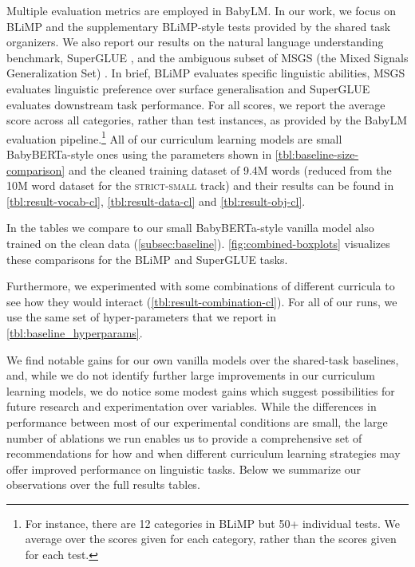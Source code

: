 Multiple evaluation metrics are employed in BabyLM. In our work, we focus on BLiMP \cite{warstadt2020blimp} and the supplementary BLiMP-style tests provided by the shared task organizers. We also report our results on the natural language understanding benchmark, SuperGLUE \cite{wang2019superglue}, and the ambiguous subset of MSGS (the Mixed Signals Generalization Set) \cite{warstadt2020msgs}. In brief, BLiMP evaluates specific linguistic abilities, MSGS evaluates linguistic preference over surface generalisation and SuperGLUE evaluates downstream task performance. For all scores, we report the average score across all categories, rather than test instances, as provided by the BabyLM evaluation pipeline.\footnote{For instance, there are 12 categories in BLiMP but 50+ individual tests. We average over the scores given for each category, rather than the scores given for each test.} All of our curriculum learning models are small BabyBERTa-style ones using the parameters shown in \cref{tbl:baseline-size-comparison} and the cleaned training dataset of 9.4M words (reduced from the 10M word dataset for the \textsc{strict-small} track) and their results can be found in \cref{tbl:result-vocab-cl}, \cref{tbl:result-data-cl} and \cref{tbl:result-obj-cl}. 


In the tables we compare to our small BabyBERTa-style vanilla model also trained on the clean data (\cref{subsec:baseline}). \cref{fig:combined-boxplots} visualizes these comparisons for the BLiMP and SuperGLUE tasks.

Furthermore, we experimented with some combinations of different curricula to see how they would interact (\cref{tbl:result-combination-cl}). For all of our runs, we use the same set of hyper-parameters that we report in \cref{tbl:baseline_hyperparams}. 


We find notable gains for our own vanilla models over the shared-task baselines, and, while we do not identify further large improvements in our curriculum learning models, we do notice some modest gains which suggest possibilities for future research and experimentation over variables. While the differences in performance between most of our experimental conditions are small, the large number of ablations we run enables us to provide a comprehensive set of recommendations for how and when different curriculum learning strategies may offer improved performance on linguistic tasks. Below we summarize our observations over the full results tables.

